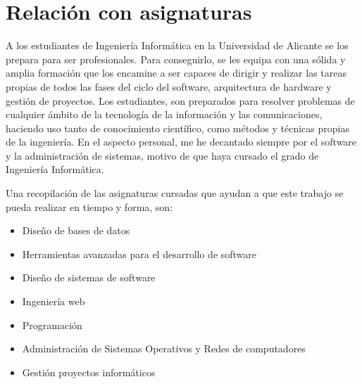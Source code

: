 \section{Relación con asignaturas}
A los estudiantes de Ingeniería Informática en la Universidad de Alicante se los prepara para ser profesionales. Para conseguirlo, se les equipa con una sólida y amplia formación que los encamine a ser capaces de dirigir y realizar las tareas propias de todos las fases del ciclo del software, arquitectura de hardware y gestión de proyectos. Los estudiantes, son preparados para resolver problemas de cualquier ámbito de la tecnología de la información y las comunicaciones, haciendo uso tanto de conocimiento científico, como métodos y técnicas propias de la ingeniería.
En el aspecto personal, me he decantado siempre por el software y la administración de sistemas, motivo de que haya cursado el grado de Ingeniería Informática.
\par Una recopilación de las asignaturas cursadas que ayudan a que este trabajo se pueda realizar en tiempo y forma, son:
\begin{itemize}
    \item Diseño de bases de datos
    \item Herramientas avanzadas para el desarrollo de software
    \item Diseño de sistemas de software
    \item Ingeniería web
    \item Programación
    \item Administración de Sistemas Operativos y Redes de computadores
    \item Gestión proyectos informáticos
\end{itemize}
